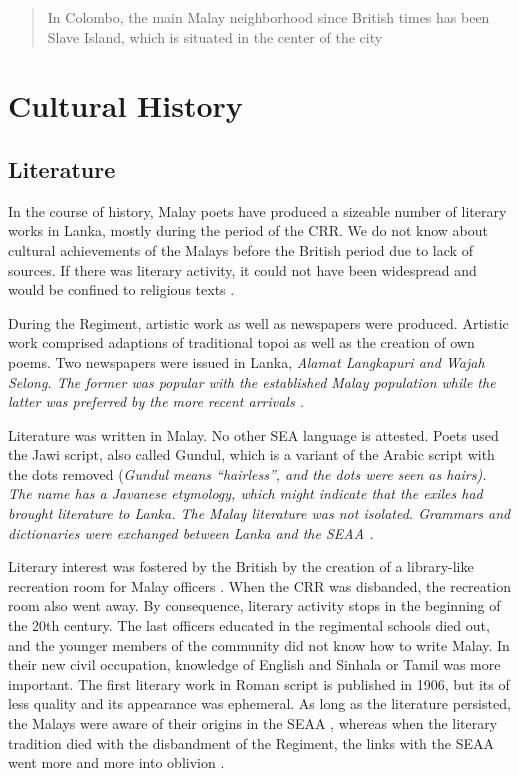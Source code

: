 \begin{quote}
In Colombo, the main Malay neighborhood since British times has been Slave Island, which is situated in the center of the city\citet[2]{Bichsel}
\end{quote}



\section{Cultural History}\label{sec:slmbg:CulturalHistory}
\subsection{Literature}\label{sec:slmbg:Literature}
In the course of history, Malay poets have produced a sizeable number of literary works in Lanka, mostly during the period of the CRR. We do not know about cultural achievements of the Malays before the British period due to lack of sources. If there was literary activity, it could not have been widespread and would be confined to religious texts \citep[143]{Hussainmiya1990}.

During the Regiment, artistic work as well as newspapers were
produced. Artistic work comprised adaptions of traditional topoi
as well as the creation of own poems. Two newspapers were issued
in Lanka, \em Alamat Langkapuri \em and  \em Wajah Selong\em. The
former was popular with the established Malay population while the
latter was preferred by the more recent arrivals
\citep[156]{Hussainmiya1990}.

Literature was written in Malay. No other SEA language is attested. Poets used the Jawi script, also called Gundul, which is a variant of the Arabic script with the dots removed (\em Gundul \em means ``hairless'', and the dots were seen as hairs). The name has a Javanese etymology, which might indicate that the exiles had brought literature to Lanka. The Malay literature was not isolated. Grammars and dictionaries were exchanged between Lanka and the SEAA \citep[145]{Hussainmiya1990}.

Literary interest was fostered by the British by the creation of a library-like recreation room for Malay officers \citep[146]{Hussainmiya1990}. When the CRR was disbanded, the recreation room also went away. By consequence, literary activity stops in the beginning of the 20th century. The last officers educated in the regimental schools died out, and the younger members of the community did not know how to write Malay. In their new civil occupation, knowledge of English and Sinhala or Tamil was more important. The first literary work in Roman script is published in 1906, but its of less quality  \citep[149]{Hussainmiya1990} and its appearance was ephemeral. As long as the literature persisted, the Malays were aware of their origins in the SEAA \citep[14]{Hussainmiya1987}, whereas when the literary tradition died with the disbandment of the Regiment, the links with the SEAA went more and more into oblivion \citep[13]{Hussainmiya1987} .

